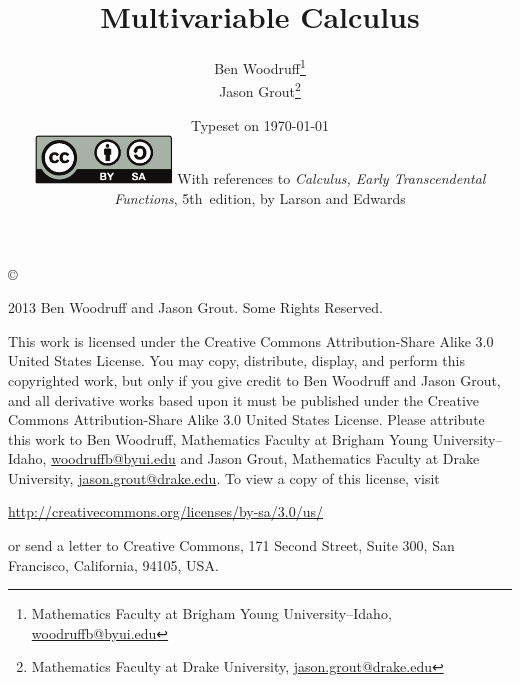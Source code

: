 \documentclass[letterpaper,oneside]{book}%
\newcommand{\larsonfive}[1]{#1}
\theoremstyle{plain}
\theoremstyle{box}
\theoremstyle{problem}
\begin{document}
\frontmatter
\title{Multivariable Calculus}
\author{Ben Woodruff\thanks{Mathematics Faculty at Brigham Young
    University--Idaho, \url{woodruffb@byui.edu}}\\
Jason Grout\thanks{Mathematics Faculty at Drake University,
\url{jason.grout@drake.edu}}}
\date{Typeset on \today\\
\vfill
\includegraphics[height=1.3cm]{by-sa}
\vfill
\larsonfive{With references to \emph{Calculus, Early Transcendental
    Functions}, 5th~edition, by Larson and Edwards}}
\maketitle
\thispagestyle{empty}
\noindent\copyright{ 2013 Ben Woodruff and Jason Grout.  Some Rights Reserved.\\

\bigskip

\noindent This work is licensed under the Creative Commons
Attribution-Share Alike 3.0 United States License.  You may copy,
distribute, display, and perform this copyrighted work, but only if
you give credit to Ben Woodruff and Jason Grout, and all derivative
works based upon it must be published under the Creative Commons
Attribution-Share Alike 3.0 United States License. Please attribute
this work to Ben Woodruff, Mathematics Faculty at Brigham Young
University--Idaho, \url{woodruffb@byui.edu} and Jason Grout,
Mathematics Faculty at Drake University, \url{jason.grout@drake.edu}. To view a copy of this license, visit
\begin{center}
  \url{http://creativecommons.org/licenses/by-sa/3.0/us/}
\end{center}
or send a letter to Creative Commons, 171 Second Street, Suite 300, San Francisco, California, 94105, USA.}
\end{document}
